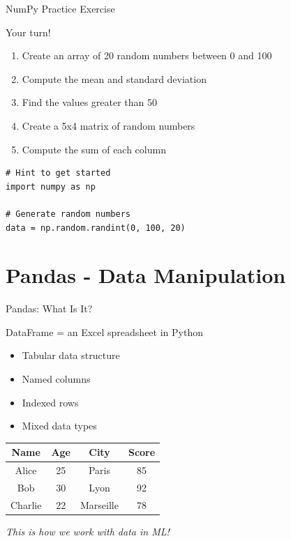 \documentclass[aspectratio=169]{beamer}
\begin{document}
\begin{frame}[fragile]{NumPy Practice Exercise}
\begin{block}{Your turn!}
\begin{enumerate}
    \item Create an array of 20 random numbers between 0 and 100
    \item Compute the mean and standard deviation
    \item Find the values greater than 50
    \item Create a 5x4 matrix of random numbers
    \item Compute the sum of each column
\end{enumerate}
\end{block}

\begin{lstlisting}
# Hint to get started
import numpy as np

# Generate random numbers
data = np.random.randint(0, 100, 20)
\end{lstlisting}
\end{frame}

\section{Pandas - Data Manipulation}

\begin{frame}{Pandas: What Is It?}
\begin{block}{DataFrame = an Excel spreadsheet in Python}
\begin{itemize}
    \item Tabular data structure
    \item Named columns
    \item Indexed rows
    \item Mixed data types
\end{itemize}
\end{block}

\vspace{0.3cm}
\begin{center}
\begin{tabular}{|c|c|c|c|}
\hline
\textbf{Name} & \textbf{Age} & \textbf{City} & \textbf{Score} \\
\hline
Alice & 25 & Paris & 85 \\
Bob & 30 & Lyon & 92 \\
Charlie & 22 & Marseille & 78 \\
\hline
\end{tabular}
\end{center}

\vspace{0.3cm}
\textit{This is how we work with data in ML!}
\end{frame}
\end{document}
